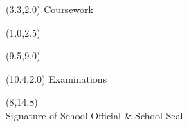 \documentclass [] {report}
\begin{document}






\begin{textblock}{8}(3.3,2.0) %
{\huge Coursework}
\end{textblock}


\begin{textblock}{8.7}(1.0,2.5)
\end{textblock}


\begin{textblock}{7.5}(9.5,9.0)
\end{textblock}



\begin{textblock}{10}(10.4,2.0) %
{\huge Examinations}
\end{textblock}



\begin{textblock}{10}(8,14.8)
\centering
\underline{\hspace{2.5in}}\\
Signature of School Official \& School Seal
\end{textblock}
\end{document}
